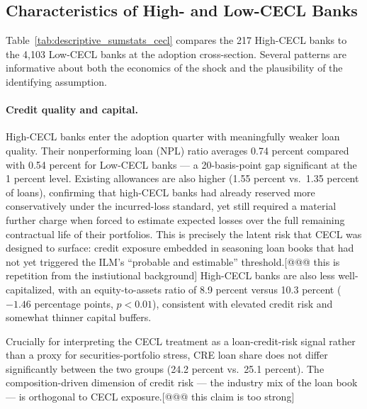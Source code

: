 \subsection{Characteristics of High- and Low-CECL Banks}
\label{sec:descriptive:balance}

Table~\ref{tab:descriptive_sumstats_cecl} compares the 217 High-CECL banks
to the 4,103 Low-CECL banks at the adoption cross-section.  Several patterns
are informative about both the economics of the shock and the plausibility of
the identifying assumption.

\paragraph{Credit quality and capital.}
High-CECL banks enter the adoption quarter with meaningfully weaker loan quality.
Their nonperforming loan (NPL) ratio averages 0.74 percent compared with
0.54 percent for Low-CECL banks --- a 20-basis-point gap significant at the
1 percent level.  Existing allowances are also higher (1.55 percent vs.\
1.35 percent of loans), confirming that high-CECL banks had already reserved
more conservatively under the incurred-loss standard, yet still required a
material further charge when forced to estimate expected losses over the full
remaining contractual life of their portfolios.  This is precisely the latent
risk that CECL was designed to surface: credit exposure embedded in seasoning
loan books that had not yet triggered the ILM's ``probable and estimable''
threshold.[@@@ this is repetition from the instiutional background]  High-CECL banks are also less well-capitalized, with an
equity-to-assets ratio of 8.9 percent versus 10.3 percent ($-1.46$ percentage
points, $p < 0.01$), consistent with elevated credit risk and somewhat thinner
capital buffers.

Crucially for interpreting the CECL treatment as a loan-credit-risk signal
rather than a proxy for securities-portfolio stress, CRE loan share does not
differ significantly between the two groups (24.2 percent vs.\ 25.1 percent).
The composition-driven dimension of credit risk --- the industry mix of the loan
book --- is orthogonal to CECL exposure.[@@@ this claim is too strong]

